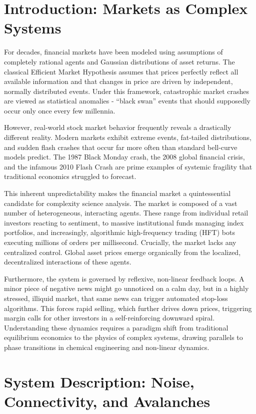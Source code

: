 \documentclass[final,5p,times,twocolumn,authoryear]{elsarticle}
\begin{document}
\section{Introduction: Markets as Complex Systems}
\label{sec:introduction}

For decades, financial markets have been modeled using assumptions of completely rational agents and Gaussian distributions of asset returns. The classical Efficient Market Hypothesis assumes that prices perfectly reflect all available information and that changes in price are driven by independent, normally distributed events. Under this framework, catastrophic market crashes are viewed as statistical anomalies - ``black swan'' events that should supposedly occur only once every few millennia. 

However, real-world stock market behavior frequently reveals a drastically different reality. Modern markets exhibit extreme events, fat-tailed distributions, and sudden flash crashes that occur far more often than standard bell-curve models predict. The 1987 Black Monday crash, the 2008 global financial crisis, and the infamous 2010 Flash Crash are prime examples of systemic fragility that traditional economics struggled to forecast.

This inherent unpredictability makes the financial market a quintessential candidate for complexity science analysis. The market is composed of a vast number of heterogeneous, interacting agents. These range from individual retail investors reacting to sentiment, to massive institutional funds managing index portfolios, and increasingly, algorithmic high-frequency trading (HFT) bots executing millions of orders per millisecond. Crucially, the market lacks any centralized control. Global asset prices emerge organically from the localized, decentralized interactions of these agents. 

Furthermore, the system is governed by reflexive, non-linear feedback loops. A minor piece of negative news might go unnoticed on a calm day, but in a highly stressed, illiquid market, that same news can trigger automated stop-loss algorithms. This forces rapid selling, which further drives down prices, triggering margin calls for other investors in a self-reinforcing downward spiral. Understanding these dynamics requires a paradigm shift from traditional equilibrium economics to the physics of complex systems, drawing parallels to phase transitions in chemical engineering and non-linear dynamics.

\section{System Description: Noise, Connectivity, and Avalanches}
\label{sec:system_description}
\end{document}
